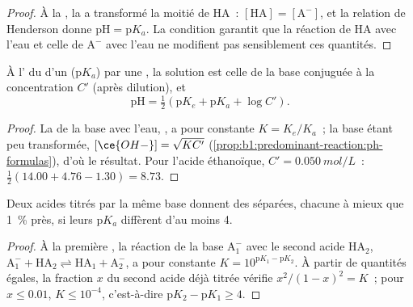 \begin{proof}
À la , la  
a transformé la moitié de HA~: $[\mathrm{HA}] = [\mathrm{A^-}]$, et la
relation de Henderson donne $\mathrm{pH} = \mathrm{p}K_a$. La condition
garantit que la réaction de HA avec l'eau et celle de $\mathrm{A^-}$ avec
l'eau ne modifient pas sensiblement ces quantités.
\end{proof}

\begin{proposition}\label{prop:b1:titration-methods:ph-at-equivalence}
À l' du  d'un  ($\mathrm{p}K_a$) par une
, la solution est celle de la base conjuguée à la
concentration $C'$ (après dilution), et
\[
  \mathrm{pH} = \tfrac12(\mathrm{p}K_e + \mathrm{p}K_a + \log C') .
\]
\end{proposition}

\begin{proof}
La  de la base avec l'eau,
, a pour constante $K = K_e/K_a$~; la base
étant peu transformée, $[\ce{OH-}] = \sqrt{KC'}$
(\cref{prop:b1:predominant-reaction:ph-formulas}), d'où le résultat. Pour
l'acide éthanoïque, $C' = \qty{0.050}{mol/L}$~:
$\frac12(14.00 + 4.76 - 1.30) = 8.73$.
\end{proof}

\begin{proposition}\label{prop:b1:titration-methods:successive}
Deux acides titrés par la même base donnent des  séparées,
chacune à mieux que \qty{1}{\percent} près, si leurs $\mathrm{p}K_a$
diffèrent d'au moins 4.
\end{proposition}

\begin{proof}
À la première , la réaction de la base $\mathrm{A_1^-}$ avec
le second acide $\mathrm{HA_2}$, $\mathrm{A_1^-} + \mathrm{HA_2}
\rightleftharpoons \mathrm{HA_1} + \mathrm{A_2^-}$, a pour constante $K = 10^{\mathrm{p}K_1 - \mathrm{p}K_2}$.
À partir de quantités égales, la fraction $x$ du second acide déjà
titrée vérifie $x^2/(1 - x)^2 = K$~; pour $x \leqslant 0.01$, $K
\leqslant 10^{-4}$, c'est-à-dire $\mathrm{p}K_2 - \mathrm{p}K_1 \geqslant 4$.
\end{proof}

